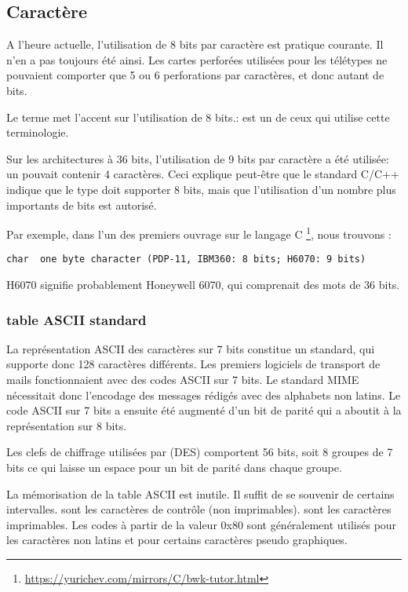 \subsection{Caractère}

A l'heure actuelle, l'utilisation de 8 bits par caractère est pratique courante.
Il n'en a pas toujours été ainsi.
Les cartes perforées utilisées pour les télétypes ne pouvaient comporter que 5 ou 6 perforations par caractères, et donc autant de bits.

Le terme  met l'accent sur l'utilisation de 8 bits.:
 est un de ceux qui utilise cette terminologie.

Sur les architectures à 36 bits, l'utilisation de 9 bits par caractère a été utilisée: un  pouvait contenir 4 caractères.
Ceci explique peut-être que le standard C/C++ indique que le type  doit supporter  8 bits, mais que l'utilisation
d'un nombre plus importants de bits est autorisé.

Par exemple, dans l'un des premiers ouvrage sur le langage C \footnote{\url{https://yurichev.com/mirrors/C/bwk-tutor.html}}, nous trouvons :

\begin{lstlisting}
char  one byte character (PDP-11, IBM360: 8 bits; H6070: 9 bits)
\end{lstlisting}

H6070 signifie probablement Honeywell 6070, qui comprenait des mots de 36 bits.

\subsubsection{table ASCII standard}

La représentation ASCII des caractères sur 7 bits constitue un standard, qui supporte donc 128 caractères différents.
Les premiers logiciels de transport de mails fonctionnaient avec des codes ASCII sur 7 bits.
Le standard \ac{MIME} nécessitait donc l'encodage des messages rédigés avec des alphabets non latins.
Le code ASCII sur 7 bits a ensuite été augmenté d'un bit de parité qui a aboutit à la représentation sur 8 bits.

Les clefs de chiffrage utilisées par  (\ac{DES}) comportent 56 bits, soit 8 groupes de 7 bits
ce qui laisse un espace pour un bit de parité dans chaque groupe.

La mémorisation de la table \ac{ASCII} est inutile. Il suffit de se souvenir de certains intervalles.
 sont les caractères de contrôle (non imprimables).
 sont les caractères imprimables.
Les codes à partir de la valeur 0x80 sont généralement utilisés pour les caractères non latins et pour certains caractères pseudo graphiques.

